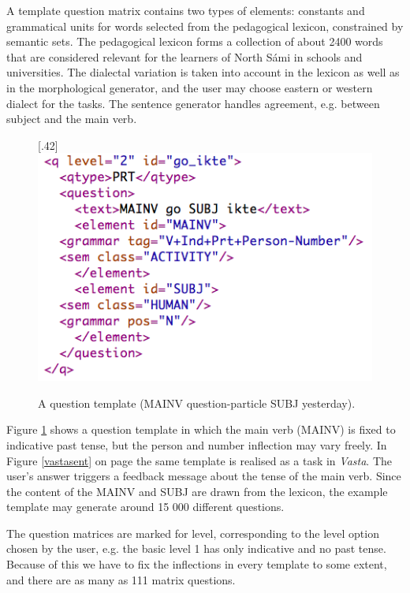 \documentclass[11pt]{article}
\begin{document}
A template question matrix contains two types of elements: constants and grammatical units for words selected from the pedagogical lexicon, constrained by semantic sets. The pedagogical lexicon forms a collection of about 2400 words that are considered relevant for the learners of North Sámi in schools and universities. The dialectal variation is taken into account in the lexicon as well as in the morphological generator, and the user may choose eastern or western dialect for the tasks. The sentence generator handles agreement, e.g. between subject and the main verb. \\ 

\begin{figure}[htbp]
\begin{center}
\scalebox{.42}[.42]{\includegraphics{presentation/img/sentencegenerator.png}}\\
\caption{A question template (MAINV question-particle SUBJ yesterday).}
\label{sentgen}
\end{center}
\end{figure}

Figure \ref{sentgen} shows a question template in which the main verb (MAINV) is fixed to indicative past tense, but the person and number inflection may vary freely. In Figure \ref{vastasent} on page \pageref{vastasent} the same template is realised as a task in \textit{Vasta}. The user's answer triggers a feedback message about the tense of the main verb. Since the content of the MAINV and SUBJ are drawn from the lexicon, the example template may generate around 15 000 different questions.

The question matrices are marked for level, corresponding to the level option chosen by the user, e.g. the basic level 1 has only indicative and no past tense. Because of this we have to fix the inflections in every template to some extent, and there are as many as 111 matrix questions. \\
 
\end{document}
